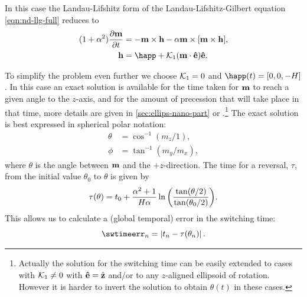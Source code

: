 In this case the Landau-Lifshitz form of the Landau-Lifshitz-Gilbert equation \cref{eqn:nd-llg-full} reduces to
\begin{equation}
  \begin{aligned}
    (1 + \dampc^2) \dmdt &= - \mv \times \hv - \dampc \mv \times \bigs{\mv \times \hv}, \\
    \hv &= \happ + \kone (\mv \cdot \ev) \ev.
    \label{eqn:nd-ode-llg}
  \end{aligned}
\end{equation}

To simplify the problem even further we choose $\mathcal{K}_1 = 0$ and $\happ(t) = [0, 0, -H]$.
In this case an exact solution is available for the time taken for $\boldsymbol{\mathrm{m}}$ to reach a given angle to the $z$-axis, and for the amount of precession that will take place in that time, more details are given in \cref{sec:ellips-nano-part} or \cite{Mallinson2000}.\footnote{Actually the solution for the switching time can be easily extended to cases with $\mathcal{K}_1 \neq 0$ with $\boldsymbol{\mathrm{\hat{e}}} = {\hat{\mathbf{z}}}$ and/or to any $z$-aligned ellipsoid of rotation.
However it is harder to invert the solution to obtain $\theta(t)$ in these cases.}
The exact solution is best expressed in spherical polar notation:
\begin{equation}
  \begin{aligned}
    \theta &= \cos^{-1}(m_z/1),\\
    \phi &= \tan^{-1}(m_y/m_x),
  \end{aligned}
\end{equation}
where $\theta$ is the angle between $\boldsymbol{\mathrm{m}}$ and the $+z$-direction.
The time for a reversal, $\tau$, from the initial value $\theta_0$ to $\theta$ is given by
\begin{equation}
  \tau(\theta) = t_0 + \frac{\alpha^2 +1}{H \alpha}
  \ln {\left(  \frac{\tan(\theta/2)}{\tan(\theta_0/2)}  \right)}.
  \label{eq:74}
\end{equation}
This allows us to calculate a (global temporal) error in the switching time:
\begin{equation}
  \swtimeerr_n = \abs{t_n - \tau(\theta_n)}.
  \label{eq:sw-time-error}
\end{equation}

